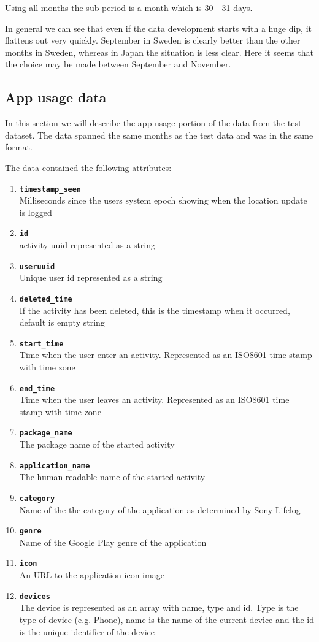 Using all months the sub-period is a month which is 30 - 31 days. 

In general we can see that even if the data development starts with a huge dip, it flattens out very quickly. September in Sweden is clearly better than the other months in Sweden, whereas in Japan the situation is less clear. Here it seems that the choice may be made between September and November. 



\subsection{App usage data}
In this section we will describe the app usage portion of the data from the test dataset.
The data spanned the same months as the test data and was in the same format.

The data contained the following attributes:
\begin{enumerate}
\item \texttt{\textbf{timestamp\_seen}}\\Milliseconds since the users system epoch showing when the location update is logged  
\item \texttt{\textbf{id}}\\activity uuid represented as a string  
\item \texttt{\textbf{useruuid}}\\Unique user id represented as a string 
\item \texttt{\textbf{deleted\_time}}\\ If the activity has been deleted, this is the timestamp when it occurred, default is empty string
\item \texttt{\textbf{start\_time}}\\Time when the user enter an activity. Represented as an ISO8601 time stamp with time zone 
\item \texttt{\textbf{end\_time}}\\Time when the user leaves an activity. Represented as an ISO8601 time stamp with time zone
\item \texttt{\textbf{package\_name}}\\ The package name of the started activity
\item \texttt{\textbf{application\_name}}\\The human readable name of the started activity
\item \texttt{\textbf{category}}\\Name of the the category of the application as determined by Sony Lifelog
\item \texttt{\textbf{genre}}\\Name of the Google Play genre of the application
\item \texttt{\textbf{icon}}\\ An URL to the application icon image
\item \texttt{\textbf{devices}}\\The device is represented as an array with name, type and id. Type is the type of device (e.g. Phone), name is the name of the current device and the id is the unique identifier of the device 
\end{enumerate}


